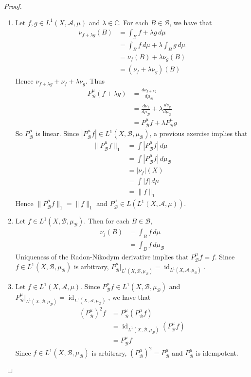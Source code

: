 \documentclass{book}
\theoremstyle{definition}
\newcommand{\lam}{\lambda}
\newcommand{\C}{\mathbb{C}}
\newcommand{\MA}{\mathcal{A}}
\newcommand{\MB}{\mathcal{B}}
\DeclareMathOperator{\id}{id}
\DeclareMathOperator*{\0}{\mbf{0}}
\DeclareMathOperator*{\1}{\mbf{1}}
\newcommand{\dmu}{\, d \mu}
\begin{document}
	\begin{proof}\
		\begin{enumerate}
			\item Let $f, g \in L^1(X, \MA, \mu)$ and $\lam \in \C$. For each $B \in \MB$, we have that 
			\begin{align*}
				\nu_{f + \lam g} (B) 
				& = \int_{B} f + \lam g \dmu \\
				& = \int_{B} f  \dmu + \lam \int_{B} g \dmu \\
				& = \nu_{f}(B) + \lam \nu_{g}(B) \\
				& = (\nu_{f} + \lam \nu_{g})(B)
			\end{align*}
			Hence $\nu_{f + \lam g} + \nu_{f} + \lam \nu_{g}$. Thus 
			\begin{align*}
				P^{\mu}_{\MB}(f + \lam g)
				& = \frac{d \nu_{f + \lam g}}{d \mu_{\MB}} \\
				& = \frac{d \nu_f }{d \mu_{\MB}} + \lam \frac{d \nu_{g}}{d \mu_{\MB}} \\
				& = P^{\mu}_{\MB} f + \lam P^{\mu}_{\MB} g
			\end{align*}
			So $P^{\mu}_{\MB}$ is linear. Since $|P^{\mu}_{\MB}f| \in L^1(X, \MB, \mu_{\MB})$, a previous exercise implies that
			\begin{align*}
				\|P^{\mu}_{\MB}f\|_1
				& = \int |P^{\mu}_{\MB}f| \dmu \\
				& = \int |P^{\mu}_{\MB}f| \dmu_{\MB} \\
				& = |\nu_{f}|(X) \\
				& = \int |f| \dmu \\
				& = \|f\|_1
			\end{align*}
			Hence $\|P^{\mu}_{\MB} f \|_1 = \|f\|_1$ and $P^{\mu}_{\MB} \in L(L^1(X, \MA, \mu))$.
			\item Let $f \in L^1(X, \MB, \mu_{\MB})$. Then for each $B \in \MB$, 
			\begin{align*}
				\nu_f(B)
				& = \int_B f \dmu \\
				& = \int_B f \dmu_{\MB} 
			\end{align*}
			Uniqueness of the Radon-Nikodym derivative implies that $P^{\mu}_{\MB}f = f$. Since $f \in L^1(X, \MB, \mu_{\MB})$ is arbitrary, $P^{\mu}_{\MB}|_{L^1(X, \MB, \mu_{\MB})} = \id_{L^1(X, \MA, \mu_{\MB})}$.
			\item Let $f \in L^1(X, \MA, \mu)$. Since $P^{\mu}_{\MB}f \in L^1(X, \MB, \mu_{\MB})$ and $P^{\mu}_{\MB}|_{L^1(X, \MB, \mu_{\MB})} = \id_{L^1(X, \MA, \mu_{\MB})}$, we have that
			\begin{align*}
				(P^{\mu}_{\MB})^2 f 
				& = P^{\mu}_{\MB}(P^{\mu}_{\MB} f) \\
				& = \id_{L^1(X, \MB, \mu_{\MB})} (P^{\mu}_{\MB} f) \\
				& = P^{\mu}_{\MB}f
			\end{align*}
			Since $f \in L^1(X, \MB, \mu_{\MB})$ is arbitrary, $(P^{\mu}_{\MB})^2 = P^{\mu}_{\MB}$ and $P^{\mu}_{\MB}$ is idempotent. 
		\end{enumerate}
	\end{proof}
\end{document}
